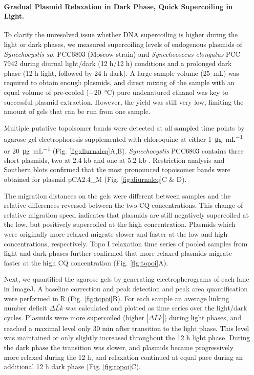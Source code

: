 \documentclass[10pt,a4]{article}
\def\cite#1{\hypersetup{citecolor=Teal}\citep{#1}} %
\newcommand{\ugml}{\micro\gram\per\milli\liter}
\newcommand{\mL}{\milli\liter}
\newcommand{\scyst}{\textit{Synechocystis} PCC6803}
\newcommand{\raim}[1]{\begingroup{\color{purple}#1}\endgroup}
\begin{document}
\paragraph{Gradual Plasmid Relaxation in Dark Phase, Quick Supercoiling in
  Light.}  To clarify the unresolved issue whether DNA supercoiling is
higher during the light or dark phases, we measured supercoiling
levels of endogenous plasmids of \textit{Synechocystis sp.} PCC6803
(Moscow strain) \raim{and \textit{Synechococcus elongatus} PCC 7942}
during diurnal light/dark (12 h/12 h) conditions and a prolonged dark
phase (12 h light, followed by 24 h dark).  A large sample volume
(\SI{25}{\mL}) was required to obtain enough plasmids, and direct
mixing of the sample with an equal volume of pre-cooled
(\SI{-20}{\celsius}) pure undenatured ethanol was key to successful
plasmid extraction. However, the yield was still very low, limiting
the amount of gels that can be run from one sample.

Multiple putative topoisomer bands were detected at all sampled time
points by agarose gel electrophoresis supplemented with chloroquine at
either \SI{1}{\ugml} or \SI{20}{\ugml}
(Fig. \ref{fig:diurnalcq}A,B). \scyst{} contains three short plasmids,
two at 2.4 kb \cite{Yang1993b, Yang1994} and one at 5.2 kb
\cite{Xu1997b} . Restriction analysis and Southern blots confirmed
that the most pronounced topoisomer bands were obtained for plasmid
pCA2.4\_M (Fig. \ref{fig:diurnalcq}C \& D).

The migration distances on the gels were different between samples and
the relative differences reversed between the two CQ
concentrations. This change of relative migration speed indicates that
plasmids are still negatively supercoiled at the low, but positively
supercoiled at the high concentration. Plasmids which were originally
more relaxed migrate slower and faster at the low and high
concentrations, respectively.  Topo I relaxation time series of pooled
samples from light and dark phases further confirmed that more relaxed
plasmids migrate faster at the high CQ concentration
(Fig. \ref{fig:topoi}A).

Next, we quantified the agarose gels by generating electropherograms
of each lane in ImageJ. A baseline correction and peak detection and
peak area quantification were performed in R
(Fig. \ref{fig:topoi}B). For each sample an average linking
number deficit $\Delta \overline{Lk}$ was calculated and plotted as time series
over the light/dark cycles.  Plasmids were more supercoiled (higher
$|\Delta \overline{Lk}|$) during light phases, and reached a maximal level only
30 min after transition to the light phase. This level was maintained
or only slightly increased throughout the 12 h light phase.  During
the dark phase the transition was slower, and plasmids became
progressively more relaxed during the 12 h, and relaxation continued
at equal pace during an additional 12 h dark phase
(Fig. \ref{fig:topoi}C).
\end{document}

